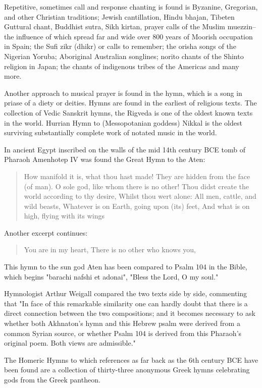 \documentclass[12pt]{article}
\begin{document}
Repetitive, sometimes call and response chanting is found is Byzanine, Gregorian, and other Christian traditions; Jewish cantillation, Hindu bhajan, Tibeten Guttural chant, Buddhist sutra, Sikh kirtan, prayer calls of the Muslim muezzin–the influence of which spread far and wide over 800 years of Moorish occupation in Spain; the Sufi zikr (dhikr) or calls to remember; the orisha songs of the Nigerian Yoruba; Aboriginal Australian songlines; norito chants of the Shinto religion in Japan; the chants of indigenous tribes of the Americas and many more.

Another approach to musical prayer is found in the hymn, which is a song in priase of a diety or deities. Hymns are found in the earliest of religious texts. The collection of Vedic Sanskrit hymns, the Rigveda is one of the oldest known texts in the world. Hurrian Hymn to (Messopotanian goddess) Nikkal is the oldest surviving substantially complete work of notated music in the world.

In ancient Egypt inscribed on the walls of the mid 14th century BCE tomb of Pharaoh Amenhotep IV was found the Great Hymn to the Aten:

\begin{quote}
How manifold it is, what thou hast made!
They are hidden from the face (of man).
O sole god, like whom there is no other!
Thou didst create the world according to thy desire,
Whilst thou wert alone: All men, cattle, and wild beasts,
Whatever is on Earth, going upon (its) feet,
And what is on high, flying with its wings
\end{quote}

Another excerpt continues:

\begin{quote}
You are in my heart,
There is no other who knows you,
\end{quote}

This hymn to the sun god Aten has been compared to Psalm 104 in the Bible, which begins "barachi nafshi et adonai", "Bless the Lord, O my soul."

Hymnologist Arthur Weigall compared the two texts side by side, commenting that "In face of this remarkable similarity one can hardly doubt that there is a direct connection between the two compositions; and it becomes necessary to ask whether both Akhnaton's hymn and this Hebrew psalm were derived from a common Syrian source, or whether Psalm 104 is derived from this Pharaoh's original poem. Both views are admissible."

The Homeric Hymns to which references as far back as the 6th century BCE have been found are a collection of thirty-three anonymous Greek hymns celebrating gods from the Greek pantheon.
\end{document}
